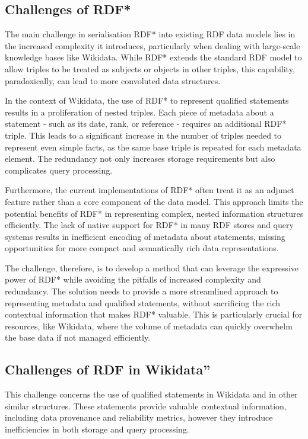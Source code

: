 \subsection{Challenges of RDF*}

The main challenge in serialisation RDF* into existing RDF data models lies in the increased complexity it introduces, particularly when dealing with large-scale knowledge bases like Wikidata. While RDF* extends the standard RDF model to allow triples to be treated as subjects or objects in other triples, this capability, paradoxically, can lead to more convoluted data structures.

In the context of Wikidata, the use of RDF* to represent qualified statements results in a proliferation of nested triples. Each piece of metadata about a statement - such as its date, rank, or reference - requires an additional RDF* triple. This leads to a significant increase in the number of triples needed to represent even simple facts, as the same base triple is repeated for each metadata element. The redundancy not only increases storage requirements but also complicates query processing.

Furthermore, the current implementations of RDF* often treat it as an adjunct feature rather than a core component of the data model. This approach limits the potential benefits of RDF* in representing complex, nested information structures efficiently. The lack of native support for RDF* in many RDF stores and query systems results in inefficient encoding of metadata about statements, missing opportunities for more compact and semantically rich data representations.

The challenge, therefore, is to develop a method that can leverage the expressive power of RDF* while avoiding the pitfalls of increased complexity and redundancy. The solution needs to provide a more streamlined approach to representing metadata and qualified statements, without sacrificing the rich contextual information that makes RDF* valuable. This is particularly crucial for resources, like Wikidata, where the volume of metadata can quickly overwhelm the base data if not managed efficiently.

\subsection{Challenges of RDF in Wikidata”}

This challenge concerns the use of qualified statements in Wikidata and in other similar structures. These statements provide valuable contextual information, including data provenance and reliability metrics, however they introduce inefficiencies in both storage and query processing.

